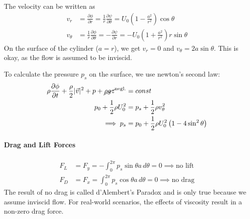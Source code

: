 The velocity can be written as
\begin{equation*}
	\begin{split}
		 v_r &= \frac{\partial \phi}{\partial r} = \frac{1}{r}\frac{\partial \psi}{\partial \theta }=U_0\left(1-\frac{a^2}{r^2}\right)\cos\theta\\
		 v_\theta &= \frac{1}{r}\frac{\partial \phi}{\partial \theta} = -\frac{\partial \psi}{\partial r} = - U_0\left(1+\frac{a^2}{r^2}\right) r \sin\theta
	\end{split}
\end{equation*}
On the surface of the cylinder ($a=r$), we get $v_r = 0$ and $v_\theta = 2a \sin\theta$. This is okay, as the flow is assumed to be inviscid. 

To calculate the pressure $p_s$ on the surface, we use newton's second law:
\begin{equation*}
	\begin{split}
		\rho \frac{\partial \phi}{\partial t}+ \frac{\rho}{2}|\vec v|^2 + p + \cancel{\rho gz}^{\text{negl.}} &= const\\
		p_0 + \frac 1 2\rho U_0^2 &= p_s + \frac 12 \rho v_{\theta}^2\\
		\implies p_s&=p_0 + \frac 12 \rho U_0^2\left(1-4\sin^2\theta\right)
	\end{split}
\end{equation*}
\paragraph{Drag and Lift Forces}
\begin{equation*}
	\begin{split}
		F_L &= F_y = -\int_0^{2\pi}p_s\sin\theta a\,d\theta = 0\implies\text{no lift}\\
		F_D & =F_x =  \int_0^{2\pi}p_s\cos\theta a \,d\theta = 0 \implies \text{no drag}
	\end{split}
\end{equation*}
The result of no drag is called d'Alembert's Paradox and is only true because we assume inviscid flow. For real-world scenarios, the effects of viscosity result in a non-zero drag force. 

